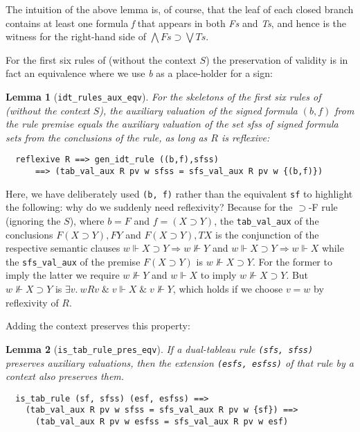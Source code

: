 \documentclass[a4paper]{article}
\newtheorem{lemma}{Lemma}
\begin{document}
The intuition of the above lemma is, of course, that the leaf of
each closed branch contains at least one formula \textit{f} that
appears in both \textit{Fs} and \textit{Ts}, and hence is the witness
for the right-hand side of $\bigwedge \mathit{Fs} \supset \bigvee \mathit{Ts}$.

For the first six rules of \cite[Figure~1.6]{fitting-dual-tableau}
(without the context $S$)
the preservation of validity is in fact an equivalence where we use
\textit{b} as a place-holder for a sign:

\begin{lemma}[\texttt{idt\_rules\_aux\_eqv}] \label{idt-rules-aux-equiv}
  For the skeletons of the first six rules of 
  \cite[Figure~1.6]{fitting-dual-tableau} (without the context $S$),
  the auxiliary valuation of the signed formula
  $(b, f)$ from the rule premise equals the auxiliary
  valuation of the set  \textit{sfss} of signed formula sets from the
  conclusions of the rule, as long as $R$ is reflexive:
\end{lemma}
\begin{verbatim}
  reflexive R ==> gen_idt_rule ((b,f),sfss) 
      ==> (tab_val_aux R pv w sfss = sfs_val_aux R pv w {(b,f)})
\end{verbatim}

Here, we have deliberately used \texttt{(b, f)} rather than the
equivalent \texttt{sf} to highlight the following: why do we suddenly
need reflexivity?  
Because for the $\supset$-F
rule (ignoring the $S$), where $b=F$ and $f = (X \supset Y)$, the
\texttt{tab\_val\_aux} of the conclusions $F (X \supset Y), F Y$
and $F (X \supset Y), T X$ is the conjunction of the respective
semantic clauses $w \Vdash X \supset Y \Rightarrow w \not\Vdash Y$ and
$w \Vdash X \supset Y \Rightarrow w \Vdash X$ while the
\texttt{sfs\_val\_aux} of the premise $F (X \supset Y)$ is
$w \not\Vdash X \supset Y$.  For the former to imply the latter we
require $w \not\Vdash Y$ and $w \Vdash X$ to imply
$w \not\Vdash X \supset Y$.  But $w \not\Vdash X \supset Y$ is
$\exists v.\ w R v \;\&\; v \Vdash X \;\&\; v \not\Vdash Y$, which
holds if we choose $v=w$ by reflexivity of $R$.

Adding the context preserves this property:
\begin{lemma}[\texttt{is\_tab\_rule\_pres\_eqv}] \label{is-tab-rule-pres-eqv}
If a dual-tableau rule \texttt{(sfs, sfss)} 
preserves auxiliary valuations,
then the extension \texttt{(esfs, esfss)} of that rule 
by a context also preserves them.
\end{lemma}
\begin{verbatim}
  is_tab_rule (sf, sfss) (esf, esfss) ==>
    (tab_val_aux R pv w sfss = sfs_val_aux R pv w {sf}) ==>
      (tab_val_aux R pv w esfss = sfs_val_aux R pv w esf)
\end{verbatim}
\end{document}
